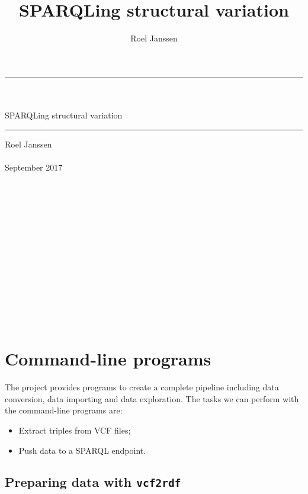 \documentclass[11pt,a4paper,oneside]{book}
\title{SPARQLing structural variation}
\author{Roel Janssen}
\begin{document}
\begin{titlepage}
  \vspace*{\fill}
  \begin{center}
    \rule{\textwidth}{1.0pt}~\\~\\
    \Huge SPARQLing structural variation
    \rule{\textwidth}{1.0pt}
    \Large Roel Janssen~\\~\\
    \large September 2017
    ~\\~\\~\\~\\~\\~\\~\\~\\~\\~\\~\\~\\~\\~\\
  \end{center}
  \vspace*{\fill}

  \thispagestyle{empty}
\end{titlepage}

\setcounter{page}{1}
\hypersetup{linkcolor=black}
\tableofcontents
\newpage{}
\hypersetup{linkcolor=LinkGray}
\setcounter{page}{1}



\chapter{Command-line programs}

  The project provides programs to create a complete pipeline including
  data conversion, data importing and data exploration.  The tasks we can
  perform with the command-line programs are:
  \begin{itemize}
    \item Extract triples from VCF files;
    \item Push data to a SPARQL endpoint.
  \end{itemize}

\section{Preparing data with \texttt{vcf2rdf}}
\label{sec:vcf2turtle}
\end{document}
